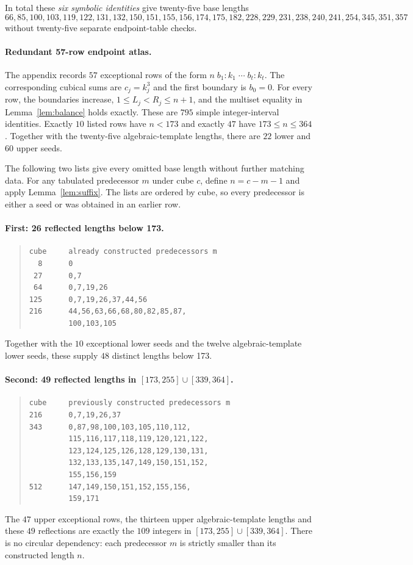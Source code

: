 \documentclass[10pt]{article}
\begin{document}
In total these \emph{six symbolic identities}
give twenty-five base lengths
\[
66,85,100,103,119,122,131,132,150,151,155,156,174,175,182,228,229,231,238,240,241,254,345,351,357
\]
without twenty-five separate endpoint-table checks.

\paragraph{Redundant 57-row endpoint atlas.}

The appendix records $57$ exceptional rows of the form
$n\; b_1:k_1\;\cdots\;b_t:k_t$.
The corresponding cubical sums are $c_j=k_j^3$
and the first boundary is $b_0=0$.
For every row, the boundaries increase,
$1\le L_j<R_j\le n+1$,
and the multiset equality in
Lemma~\ref{lem:balance} holds exactly.
These are $795$ simple integer-interval
identities. Exactly $10$ listed rows have
$n<173$ and exactly $47$ have $173\le n\le364$.
Together with the twenty-five algebraic-template lengths,
there are $22$ lower and $60$ upper seeds.

The following two lists give every omitted
base length without further matching data.
For any tabulated predecessor $m$ under
cube $c$, define $n=c-m-1$ and apply
Lemma~\ref{lem:suffix}. The lists are
ordered by cube, so every predecessor is
either a seed or was obtained in an earlier row.

\paragraph{First: 26 reflected lengths below 173.}
\begin{quote}
\footnotesize
\begin{verbatim}
cube     already constructed predecessors m
  8      0
 27      0,7
 64      0,7,19,26
125      0,7,19,26,37,44,56
216      44,56,63,66,68,80,82,85,87,
         100,103,105
\end{verbatim}
\end{quote}
Together with the $10$ exceptional lower seeds
and the twelve algebraic-template lower seeds,
these supply $48$ distinct lengths below 173.

\paragraph{Second: 49 reflected lengths in
$[173,255]\cup[339,364]$.}
\begin{quote}
\footnotesize
\begin{verbatim}
cube     previously constructed predecessors m
216      0,7,19,26,37
343      0,87,98,100,103,105,110,112,
         115,116,117,118,119,120,121,122,
         123,124,125,126,128,129,130,131,
         132,133,135,147,149,150,151,152,
         155,156,159
512      147,149,150,151,152,155,156,
         159,171
\end{verbatim}
\end{quote}
The $47$ upper exceptional rows, the thirteen
upper algebraic-template lengths and these $49$
reflections are exactly the $109$ integers
in $[173,255]\cup[339,364]$.
There is no circular dependency:
each predecessor $m$ is strictly smaller
than its constructed length $n$.
\end{document}
